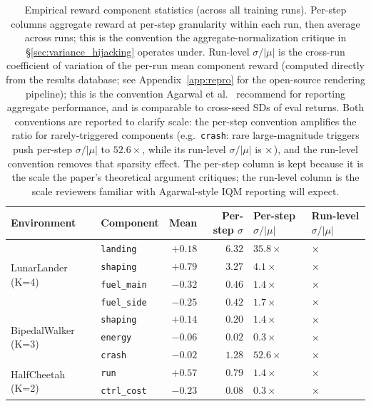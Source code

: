 \documentclass[11pt,a4paper]{article}
\DeclareRobustCommand{\cnum}[1]{\unskip}
\begin{document}
\begin{table}[H]
\centering
\caption{Empirical reward component statistics (across all training runs). Per-step columns aggregate reward at per-step granularity within each run, then average across runs; this is the convention the aggregate-normalization critique in §\ref{sec:variance_hijacking} operates under. Run-level $\sigma/|\mu|$ is the cross-run coefficient of variation of the per-run mean component reward (computed directly from the results database; see Appendix~\ref{app:repro} for the open-source rendering pipeline); this is the convention Agarwal et al.~\cite{agarwal2021rliable} recommend for reporting aggregate performance, and is comparable to cross-seed SDs of eval returns. Both conventions are reported to clarify scale: the per-step convention amplifies the ratio for rarely-triggered components (e.g.\ \texttt{crash}: rare large-magnitude triggers push per-step $\sigma/|\mu|$ to $52.6\times$, while its run-level $\sigma/|\mu|$ is $\cnum{compstat_bw_crash_cv_rl}\times$), and the run-level convention removes that sparsity effect. The per-step column is kept because it is the scale the paper's theoretical argument critiques; the run-level column is the scale reviewers familiar with Agarwal-style IQM reporting will expect.}
\label{tab:app_comp_stats}
\small
\begin{tabular}{llrrll}
\toprule
Environment & Component & Mean & Per-step $\sigma$ & Per-step $\sigma/|\mu|$ & Run-level $\sigma/|\mu|$ \\
\midrule
\multirow{4}{*}{LunarLander (K=4)}
  & \texttt{landing} & $+0.18$ & $6.32$ & $35.8\times$ & $\cnum{compstat_ll_landing_cv_rl}\times$ \\
  & \texttt{shaping} & $+0.79$ & $3.27$ & $4.1\times$ & $\cnum{compstat_ll_shaping_cv_rl}\times$ \\
  & \texttt{fuel\_main} & $-0.32$ & $0.46$ & $1.4\times$ & $\cnum{compstat_ll_fuel_main_cv_rl}\times$ \\
  & \texttt{fuel\_side} & $-0.25$ & $0.42$ & $1.7\times$ & $\cnum{compstat_ll_fuel_side_cv_rl}\times$ \\
\midrule
\multirow{3}{*}{BipedalWalker (K=3)}
  & \texttt{shaping} & $+0.14$ & $0.20$ & $1.4\times$ & $\cnum{compstat_bw_shaping_cv_rl}\times$ \\
  & \texttt{energy} & $-0.06$ & $0.02$ & $0.3\times$ & $\cnum{compstat_bw_energy_cv_rl}\times$ \\
  & \texttt{crash} & $-0.02$ & $1.28$ & $52.6\times$ & $\cnum{compstat_bw_crash_cv_rl}\times$ \\
\midrule
\multirow{2}{*}{HalfCheetah (K=2)}
  & \texttt{run} & $+0.57$ & $0.79$ & $1.4\times$ & $\cnum{compstat_hc_run_cv_rl}\times$ \\
  & \texttt{ctrl\_cost} & $-0.23$ & $0.08$ & $0.3\times$ & $\cnum{compstat_hc_ctrl_cost_cv_rl}\times$ \\
\bottomrule
\end{tabular}
\end{table}
\end{document}
